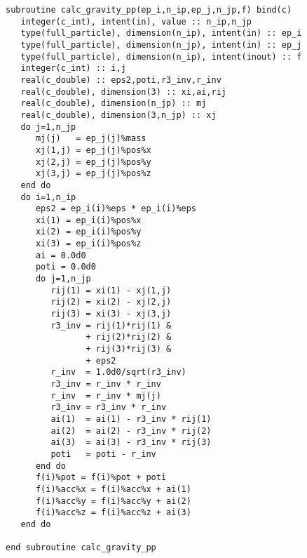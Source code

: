 \documentclass[10pt,twocolumn,a4paper,fleqn]{article}
\begin{document}

\begin{mdframed}[
    backgroundcolor=bg,
    topline=false,
    bottomline=false,
    leftline=false,
    rightline=false]
\begin{verbatim}
subroutine calc_gravity_pp(ep_i,n_ip,ep_j,n_jp,f) bind(c)        
   integer(c_int), intent(in), value :: n_ip,n_jp                
   type(full_particle), dimension(n_ip), intent(in) :: ep_i      
   type(full_particle), dimension(n_jp), intent(in) :: ep_j      
   type(full_particle), dimension(n_ip), intent(inout) :: f                   
   integer(c_int) :: i,j                                         
   real(c_double) :: eps2,poti,r3_inv,r_inv                      
   real(c_double), dimension(3) :: xi,ai,rij                     
   real(c_double), dimension(n_jp) :: mj                         
   real(c_double), dimension(3,n_jp) :: xj                  
   do j=1,n_jp                                
      mj(j)   = ep_j(j)%mass                  
      xj(1,j) = ep_j(j)%pos%x                 
      xj(2,j) = ep_j(j)%pos%y                 
      xj(3,j) = ep_j(j)%pos%z                 
   end do                                     
   do i=1,n_ip                                
      eps2 = ep_i(i)%eps * ep_i(i)%eps        
      xi(1) = ep_i(i)%pos%x                   
      xi(2) = ep_i(i)%pos%y                   
      xi(3) = ep_i(i)%pos%z                   
      ai = 0.0d0                              
      poti = 0.0d0                            
      do j=1,n_jp                             
         rij(1) = xi(1) - xj(1,j)             
         rij(2) = xi(2) - xj(2,j)             
         rij(3) = xi(3) - xj(3,j)             
         r3_inv = rij(1)*rij(1) &             
                + rij(2)*rij(2) &             
                + rij(3)*rij(3) &             
                + eps2                        
         r_inv  = 1.0d0/sqrt(r3_inv)          
         r3_inv = r_inv * r_inv               
         r_inv  = r_inv * mj(j)               
         r3_inv = r3_inv * r_inv              
         ai(1)  = ai(1) - r3_inv * rij(1)     
         ai(2)  = ai(2) - r3_inv * rij(2)     
         ai(3)  = ai(3) - r3_inv * rij(3)     
         poti   = poti - r_inv                
      end do                                  
      f(i)%pot = f(i)%pot + poti              
      f(i)%acc%x = f(i)%acc%x + ai(1)         
      f(i)%acc%y = f(i)%acc%y + ai(2)         
      f(i)%acc%z = f(i)%acc%z + ai(3)         
   end do                                     
                                                
end subroutine calc_gravity_pp                     
\end{verbatim}
\end{mdframed}



\end{document}
